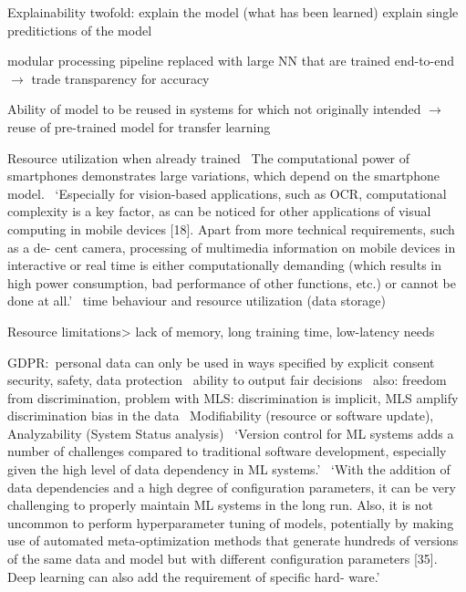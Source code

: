Explainability twofold: explain the model (what has been learned) explain single preditictions of the model~\cite{vogelsang_requirements_2019}

modular processing pipeline replaced with large NN that are trained end-to-end
$\rightarrow$ trade transparency for accuracy~\cite{arpteg_software_2018}

Ability of model to be reused in systems for which not originally intended $\rightarrow$ reuse of
pre-trained model for transfer learning~\citep{ashmore_assuring_2021}



Resource utilization when already trained~\citep{siebert_construction_2021}
The computational power of smartphones demonstrates large variations, which depend on the
smartphone model.~\cite{sourvanos_challenges_2018}
`Especially for vision-based applications, such as OCR, computational complexity is a key factor, as can be noticed for other applications of visual computing in mobile devices [18]. Apart from more technical requirements, such as a de- cent camera, processing of multimedia information on mobile devices in interactive or real time is either computationally demanding (which results in high power consumption, bad performance of other functions, etc.) or cannot be done at all.'~\cite{sourvanos_challenges_2018}
time behaviour and resource utilization (data storage)\cite{nakamichi_requirements-driven_2020}

Resource limitations> lack of memory, long training time, low-latency needs~\cite{arpteg_software_2018}


GDPR:\ personal data can only be used in ways specified by explicit consent~\cite{vogelsang_requirements_2019}
security, safety, data protection~\cite{siebert_construction_2021}
ability to output fair decisions~\cite{siebert_construction_2021}
also: freedom from discrimination, problem with \ac{MLS}: discrimination is implicit, \ac{MLS} amplify
discrimination bias in the data~\cite{vogelsang_requirements_2019}
Modifiability (resource or software update), Analyzability (System Status
analysis)~\cite{nakamichi_requirements-driven_2020}
`Version control for ML systems adds a number of challenges compared to traditional software
development, especially given the high level of data dependency in ML
systems.'~\cite{arpteg_software_2018}
`With the addition of data dependencies and a high degree of configuration parameters, it can
be very challenging to properly maintain ML systems in the long run. Also, it is not uncommon to
perform hyperparameter tuning of models, potentially by making use of automated meta-optimization
methods that generate hundreds of versions of the same data and model but with different
configuration parameters [35]. Deep learning can also add the requirement of specific hard-
ware.'~\cite{arpteg_software_2018}
